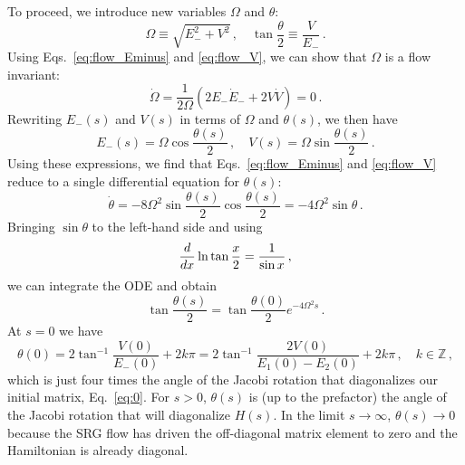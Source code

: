 To proceed, we introduce new variables $\Omega$ and $\theta$:
\begin{equation}
  \Omega \equiv \sqrt{E_{-}^2 + V^2}\,,\quad \tan\frac{\theta}{2} \equiv \frac{V}{E_{-}}\,.
\end{equation}
Using Eqs.~\eqref{eq:flow_Eminus} and \eqref{eq:flow_V}, we can show 
that $\Omega$ is a flow invariant:
\begin{equation}
  \dot\Omega = \frac{1}{2\Omega}(2 E_{-}\dot{E}_{-} + 2 V \dot{V}) = 0\,.
\end{equation}
Rewriting $E_{-}(s)$ and $V(s)$ in terms of $\Omega$ and $\theta(s)$,
we then have
\begin{equation}\label{eq:srg_toy_parameters}
  E_{-}(s) = \Omega \cos\frac{\theta(s)}{2}\,,\quad V(s) = \Omega \sin\frac{\theta(s)}{2}\,.
\end{equation}
Using these expressions, we find that Eqs.~\eqref{eq:flow_Eminus} and \eqref{eq:flow_V}
reduce to a single differential equation for $\theta(s)$:
\begin{equation}
  \dot\theta = - 8\Omega^2\sin\frac{\theta(s)}{2}\cos\frac{\theta(s)}{2} = -4\Omega^2\sin\theta\,.
\end{equation}
Bringing $\sin\theta$ to the left-hand side and using
\begin{equation}
   \frac{d {}} {d {x}} \ln\tan\frac{x}{2}=\frac{1}{\sin x}\,,
\end{equation}
we can integrate the ODE and obtain
\begin{equation}\label{eq:srg_toy_theta}
  \tan\frac{\theta(s)}{2} = \tan\frac{\theta(0)}{2} e^{-4\Omega^2 s}\,.
\end{equation}
At $s=0$ we have
\begin{equation}
  \theta(0) = 2 \tan^{-1} \frac{V(0)}{E_{-}(0)} + 2k\pi= 2 \tan^{-1}\frac{2 V(0)}{E_{1}(0) - E_{2}(0)}+2k\pi\,,
  \quad k \in \mathbb{Z}\,,
\end{equation}
which is just four times the angle of the Jacobi rotation that diagonalizes our initial
matrix, Eq.~\eqref{eq:0}. For $s>0$, $\theta(s)$ is (up to the prefactor) the 
angle of the Jacobi rotation that will diagonalize $H(s)$. In the limit $s\to\infty$,
$\theta(s)\to 0$ because the SRG flow has driven the off-diagonal matrix element to 
zero and the Hamiltonian is already diagonal.


